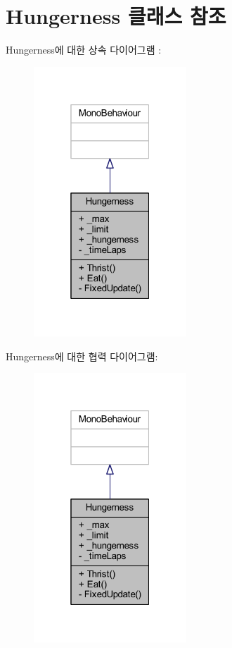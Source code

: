 \hypertarget{class_hungerness}{}\section{Hungerness 클래스 참조}
\label{class_hungerness}


Hungerness에 대한 상속 다이어그램 \+: \nopagebreak
\begin{figure}[H]
\begin{center}
\leavevmode
\includegraphics[width=163pt]{d4/d71/class_hungerness__inherit__graph}
\end{center}
\end{figure}


Hungerness에 대한 협력 다이어그램\+:\nopagebreak
\begin{figure}[H]
\begin{center}
\leavevmode
\includegraphics[width=163pt]{da/d17/class_hungerness__coll__graph}
\end{center}
\end{figure}
